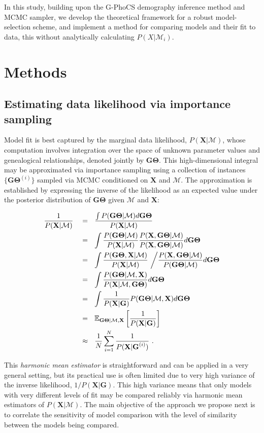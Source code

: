 \documentclass[11pt]{article}
\newcommand{\vect}[1]{\boldsymbol{\mathbf{#1}}}
\newcommand{\E}{\mathbb{E}}
\newcommand{\X}{\vect{X}}
\newcommand{\M}{\mathcal{M}}
\newcommand{\G}{\vect{G}}
\newcommand{\T}{\vect{\Theta}}
\newcommand{\GT}{\G\T}
\newcommand{\1}{\mathbbm{1}}
\newcommand{\gp}{G-PhoCS }
\begin{document}
In this study, building upon the \gp demography inference method and MCMC sampler, we develop the theoretical framework for a robust model-selection scheme, and implement a method for comparing models and their fit to data, this without analytically calculating $P(X|\M_i)$.

\section{Methods} \label{Methods}


\subsection{Estimating data likelihood via importance sampling}

Model fit is best captured by the marginal data likelihood, $P(\X|\M)$, whose computation involves integration over the space of unknown parameter values and genealogical relationships,
denoted jointly by $\GT$.
%
This high-dimensional integral may be approximated via importance sampling using a collection of instances $\{\GT^{(i)}\}$ sampled via MCMC conditioned on $\X$ and $\M$.
%
The approximation is established by expressing the inverse of the likelihood as an expected value under the posterior distribution of $\GT$ given $\M$ and $\X$:
%
%
\begin{small}
\begin{align}
\frac{1}{P(\X|\M)} ~~~
&=~~ \frac{\int P(\GT|\M)d\GT}{P(\X|\M)} \notag \\ %
&=~~ \int \frac{P(\GT|\M)}{P(\X|\M)} \frac{P(\X,\GT|\M)}{P(\X,\GT|\M)}  d\GT \notag \\ %
&=~~ \int \frac{P(\GT,\X |\M)}{P(\X|\M)} ~\bigg/ \frac{P(\X,\GT|\M)}{P(\GT|\M)}  d\GT \notag \\ %
&=~~ \int \frac{P(\GT|\M,\X)}{P(\X|\M,\GT)} d\GT \notag \\ %
&=~~ \int \frac{1}{P(\X|\G)}P(\GT|\M,\X) d\GT  \notag \\ %
&=~~ \E_{\GT|\M,\X } \left[\frac{1}{P(\X|\G)}\right] \notag\\  %
&\approx~~ \frac{1}{N} \sum_{i=1}^{N}\frac{1}{P(\X|\G^{(i)})} ~. \label{eq:harmonic}
\end{align}
\end{small}

This {\em harmonic mean estimator} is straightforward and can be applied in a very general setting, but its practical use is often limited due to very high variance
of the inverse likelihood, $1/P(\X|\G)$.
%
This high variance means that only models with very different levels of fit may be compared reliably via harmonic mean estimators of $P(\X|\M)$.
%
The main objective of the approach we propose next is to correlate the sensitivity of model comparison with the level of similarity between the models being compared.
%
\end{document}
